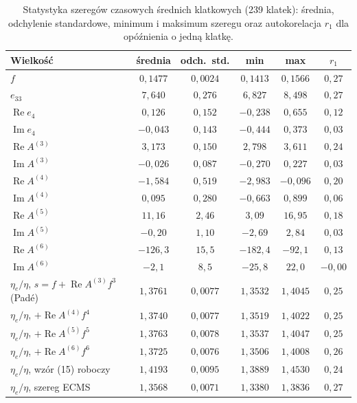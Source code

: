 \documentclass[12pt,a4paper,twoside,openright]{report}
\theoremstyle{definition}
\theoremstyle{remark}
\newcommand{\ziel}[1]{{\color{green!50!black}#1}}
\renewcommand{\Re}{\operatorname{Re}}
\renewcommand{\Im}{\operatorname{Im}}
\begin{document}
\begin{table}[htbp]
\centering\small
\caption{\ziel{Statystyka szeregów czasowych średnich klatkowych (239 klatek): średnia, odchylenie standardowe, minimum i maksimum szeregu oraz autokorelacja $r_1$ dla opóźnienia o jedną klatkę.}}\label{tab:szeregi}
\begin{tabular}{@{}lccccc@{}}
\toprule
\textbf{Wielkość} & \textbf{średnia} & \textbf{odch.\ std.} & \textbf{min} & \textbf{max} & $r_1$\\
\midrule
$f$ & $0{,}1477$ & $0{,}0024$ & $0{,}1413$ & $0{,}1566$ & $0{,}27$\\
$e_{33}$ & $7{,}640$ & $0{,}276$ & $6{,}827$ & $8{,}498$ & $0{,}27$\\
$\Re e_4$ & $0{,}126$ & $0{,}152$ & $-0{,}238$ & $0{,}655$ & $0{,}12$\\
$\Im e_4$ & $-0{,}043$ & $0{,}143$ & $-0{,}444$ & $0{,}373$ & $0{,}03$\\
$\Re A^{(3)}$ & $3{,}173$ & $0{,}150$ & $2{,}798$ & $3{,}611$ & $0{,}24$\\
$\Im A^{(3)}$ & $-0{,}026$ & $0{,}087$ & $-0{,}270$ & $0{,}227$ & $0{,}03$\\
$\Re A^{(4)}$ & $-1{,}584$ & $0{,}519$ & $-2{,}983$ & $-0{,}096$ & $0{,}20$\\
$\Im A^{(4)}$ & $0{,}095$ & $0{,}280$ & $-0{,}663$ & $0{,}899$ & $0{,}06$\\
$\Re A^{(5)}$ & $11{,}16$ & $2{,}46$ & $3{,}09$ & $16{,}95$ & $0{,}18$\\
$\Im A^{(5)}$ & $-0{,}20$ & $1{,}10$ & $-2{,}69$ & $2{,}84$ & $0{,}03$\\
$\Re A^{(6)}$ & $-126{,}3$ & $15{,}5$ & $-182{,}4$ & $-92{,}1$ & $0{,}13$\\
$\Im A^{(6)}$ & $-2{,}1$ & $8{,}5$ & $-25{,}8$ & $22{,}0$ & $-0{,}00$\\
\midrule
$\eta_e/\eta$, $s=f+\Re A^{(3)}f^3$ (Padé) & $1{,}3761$ & $0{,}0077$ & $1{,}3532$ & $1{,}4045$ & $0{,}25$\\
$\eta_e/\eta$, $+\Re A^{(4)}f^4$ & $1{,}3740$ & $0{,}0077$ & $1{,}3519$ & $1{,}4022$ & $0{,}25$\\
$\eta_e/\eta$, $+\Re A^{(5)}f^5$ & $1{,}3763$ & $0{,}0078$ & $1{,}3537$ & $1{,}4047$ & $0{,}25$\\
$\eta_e/\eta$, $+\Re A^{(6)}f^6$ & $1{,}3725$ & $0{,}0076$ & $1{,}3506$ & $1{,}4008$ & $0{,}26$\\
$\eta_e/\eta$, wzór (15) roboczy & $1{,}4193$ & $0{,}0095$ & $1{,}3889$ & $1{,}4530$ & $0{,}24$\\
$\eta_e/\eta$, szereg ECMS & $1{,}3568$ & $0{,}0071$ & $1{,}3380$ & $1{,}3836$ & $0{,}27$\\
\bottomrule
\end{tabular}
\end{table}
\end{document}
